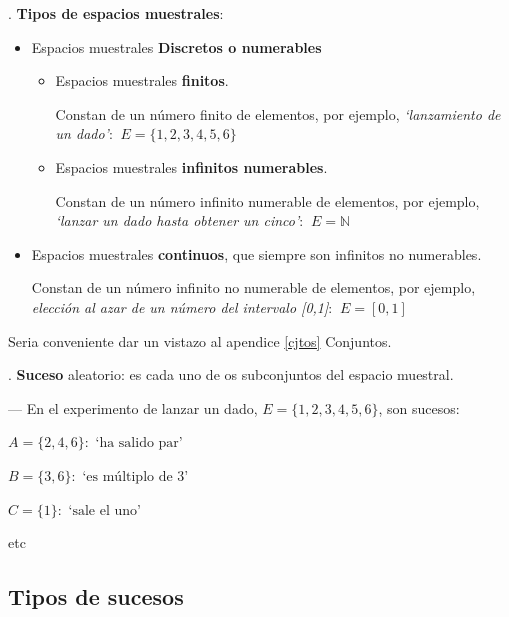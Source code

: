\begin{theorem}
.	\textbf{Tipos de espacios muestrales}:

\begin{itemize}
	\item Espacios muestrales \textbf{Discretos o numerables}
		\begin{itemize}
			\item Espacios muestrales \textbf{finitos}.
			
			Constan de un número finito de elementos, por ejemplo, \emph{`lanzamiento de un dado'}: $\ E=\{1,2,3,4,5,6\}$
			\item Espacios muestrales \textbf{infinitos numerables}.
			
			Constan de un número infinito numerable de elementos, por ejemplo, \emph{`lanzar un dado hasta obtener un cinco'}: $\ E=\mathbb N$
		\end{itemize}
	\item Espacios muestrales \textbf{continuos}, que siempre son infinitos no numerables.	
	
	Constan de un número infinito no numerable de elementos, por ejemplo, \emph{elección al azar de un número del intervalo [0,1]}: $\ E=[0,1]$
\end{itemize}	
\end{theorem}


\begin{destacado}
Seria conveniente dar un vistazo al  apendice \ref{cjtos}  Conjuntos.	
\end{destacado}


\begin{definition}
.	\textbf{Suceso} aleatorio: es cada uno de os subconjuntos del espacio muestral.

--- En el experimento de lanzar un dado, $E=\{1,2,3,4,5,6\}$, son sucesos:

\begin{multicols}{2}
	$A=\{2,4,6\}: \text{ `ha salido par'}$
 
	$B=\{3,6\}: \text{ `es múltiplo de 3'}$

	$C=\{1\}: \text{ `sale el uno'}$

	etc 
\end{multicols}
\end{definition}

\subsection{Tipos de sucesos}

